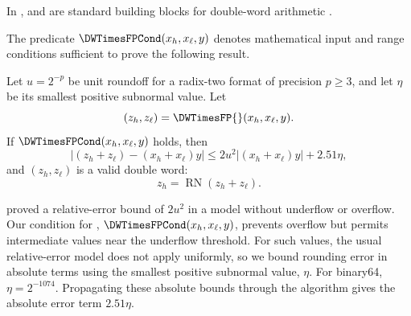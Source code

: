 In , \FastTwoMult{} and \FastTwoSum{} are standard
building blocks for double-word arithmetic
\citep{Dekker1971,Joldes2017}.

The predicate $\DWTimesFPCond(x_h,x_\ell,y)$ denotes mathematical input and
range conditions sufficient to prove the following result.

\begin{theorem}
\label{thm:dw-times-fp-numerical}
Let $u=2^{-p}$ be unit roundoff for a radix-two format of precision $p\geq3$,
and let $\eta$ be its smallest positive subnormal value.  Let
\[
  (z_h,z_\ell)=\DWTimesFP{}(x_h,x_\ell,y).
\]
If $\DWTimesFPCond(x_h,x_\ell,y)$ holds, then
\begin{equation}
  \left|(z_h+z_\ell)-(x_h+x_\ell)y\right|
  \leq 2u^2\left|(x_h+x_\ell)y\right|+2.51\eta,
  \label{eq:dw-times-fp-mixed}
\end{equation}
and $(z_h,z_\ell)$ is a valid double word:
\[
  z_h=\operatorname{RN}(z_h+z_\ell).
\]
\end{theorem}

\citet{Joldes2017} proved a relative-error bound of $2u^2$ in a model
without underflow or overflow.  Our condition for \DWTimesFP{},
$\DWTimesFPCond(x_h,x_\ell,y)$, prevents overflow but permits intermediate
values near the underflow threshold.  For such values, the usual
relative-error model does not apply uniformly, so we
bound rounding error in absolute terms using the smallest positive subnormal
value, $\eta$.  For binary64, $\eta=2^{-1074}$.  Propagating these absolute
bounds through the algorithm gives the absolute error term $2.51\eta$.



